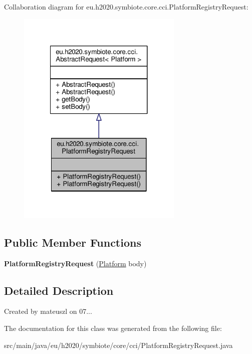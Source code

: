 Collaboration diagram for eu.\+h2020.\+symbiote.\+core.\+cci.\+Platform\+Registry\+Request\+:
\nopagebreak
\begin{figure}[H]
\begin{center}
\leavevmode
\includegraphics[width=224pt]{classeu_1_1h2020_1_1symbiote_1_1core_1_1cci_1_1PlatformRegistryRequest__coll__graph}
\end{center}
\end{figure}
\subsection*{Public Member Functions}
\begin{DoxyCompactItemize}
\item 
\mbox{\label{classeu_1_1h2020_1_1symbiote_1_1core_1_1cci_1_1PlatformRegistryRequest_a439c9d6d6a12be6a47fb765c48e1a4ab}} 
{\bfseries Platform\+Registry\+Request} (\hyperlink{classeu_1_1h2020_1_1symbiote_1_1model_1_1mim_1_1Platform}{Platform} body)
\end{DoxyCompactItemize}


\subsection{Detailed Description}
Created by mateuszl on 07... 

The documentation for this class was generated from the following file\+:\begin{DoxyCompactItemize}
\item 
src/main/java/eu/h2020/symbiote/core/cci/Platform\+Registry\+Request.\+java\end{DoxyCompactItemize}

